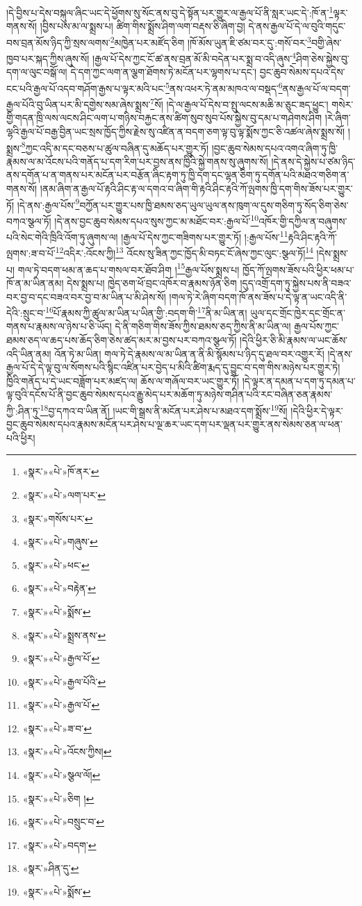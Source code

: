 །དེ་བྱིས་པ་དེས་བསྐུལ་ཞིང་ཡང་དེ་ཕྱོགས་སུ་སོང་ནས་བུ་དེ་སྟོན་པར་གྱུར་ལ་རྒྱལ་པོ་ནི་སླར་ཡང་དེ་:ཁོ་ན་\footnote{«སྣར་»«པེ་»ཁོ་ནར་}ལྟར་གནས་སོ། །བྱིས་པས་མ་ལ་སྨྲས་པ། ཚིག་གིས་སྨྲོས་ཤིག་ལག་བརྡས་ཅི་ཞིག་བྱ། དེ་ནས་རྒྱལ་པོ་དེ་ལ་བུའི་གདུང་བས་བྲན་མོས་ཉིད་ཀྱི་སྲས་ལགས་\footnote{«སྣར་»«པེ་»ལག་པར་}མཁྱེན་པར་མཛོད་ཅིག །ཁོ་མོས་ཡུན་ཇི་ཙམ་བར་དུ་:གསོ་བར་\footnote{«སྣར་»གསོས་པར་}བགྱི་ཞེས་ཁྱབ་པར་སྐད་ཀྱིས་ཞུས་སོ། །རྒྱལ་པོ་དེས་ཀྱང་ངོ་ཚ་ནས་བྲན་མོ་མི་བདེན་པར་སྨྲ་བ་འདི་ཞུས་\footnote{«སྣར་»«པེ་»གཞུས་}ཤིག་ཅེས་སྐྱེས་བུ་དག་ལ་ལུང་བསྒོ་ལ། དེ་དག་ཀྱང་ལག་ན་ལྕག་ཐོགས་ཏེ་མངོན་པར་ལྷགས་པ་དང་། བྱང་ཆུབ་སེམས་དཔའ་དེས་ངང་པའི་རྒྱལ་པོ་འདབ་གཤོག་རྒྱས་པ་ལྟར་མའི་པང་\footnote{«སྣར་»«པེ་»ཕང་}ནས་འཕར་ཏེ་ནམ་མཁའ་ལ་བསྡད་\footnote{«སྣར་»«པེ་»བརྟེན་}ནས་རྒྱལ་པོ་ལ་བདག་རྒྱལ་པོའི་བུ་ཡིན་པར་མི་དགྱེས་སམ་ཞེས་སྨྲས་\footnote{«སྣར་»«པེ་»སྨོས་}སོ། །དེ་ལ་རྒྱལ་པོ་དེས་བ་སྤུ་ལངས་མཆི་མ་ཅུང་ཟད་ཕྱུང་། གསེར་གྱི་གདན་ཁྲི་ལས་ལངས་ཤིང་ལག་པ་གཉིས་བརྐྱང་ནས་ཚིག་སུབ་སུབ་པོས་སྐྱེས་བུ་དམ་པ་གཤེགས་ཤིག །རེ་ཞིག་ལྷའི་རྒྱལ་པོ་བརྒྱ་བྱིན་ཡང་སྲས་ཁྱོད་ཀྱིས་རྗེས་སུ་འཛིན་ན་བདག་ཅག་ལྟ་བུ་ལྟ་སྨོས་ཀྱང་ཅི་འཚལ་ཞེས་སྨྲས་སོ། །སྨྲས་\footnote{«སྣར་»«པེ་»སྨྲས་ནས་}ཀྱང་འདི་མ་དང་བཅས་པ་ཚུལ་བཞིན་དུ་མཆོད་པར་གྱུར་ཏོ། །བྱང་ཆུབ་སེམས་དཔའ་འགའ་ཞིག་ཏུ་ཁྱི་རྣམས་ལ་མ་འོངས་པའི་གནོད་པ་དག་རིག་པར་བྱས་ནས་ཁྱིའི་སྐྱེ་གནས་སུ་ཞུགས་སོ། །དེ་ནས་དེ་སྐྱེས་པ་ཙམ་ཉིད་ནས་དགོན་པ་ན་གནས་པར་མངོན་པར་བརྩོན་ཞིང་རྟག་ཏུ་ཁྱི་དག་དང་ལྷན་ཅིག་ཏུ་དགོན་པའི་མཐའ་གཅིག་ན་གནས་སོ། །ནམ་ཞིག་ན་རྒྱལ་པོ་རྟའི་ཤིང་རྟ་ལ་དགའ་བ་ཞིག་གི་རྟའི་ཤིང་རྟའི་ཀོ་ལྤགས་ཁྱི་དག་གིས་ཟོས་པར་གྱུར་ཏོ། །དེ་ནས་:རྒྱལ་པོས་\footnote{«སྣར་»«པེ་»རྒྱལ་པོ་}བཀྱོན་པར་གྱུར་པས་ཁྱི་ཐམས་ཅད་ཡུལ་ཡུལ་ནས་ཁུག་ལ་དུས་གཅིག་ཏུ་སོད་ཅིག་ཅེས་བཀའ་སྩལ་ཏོ། །དེ་ནས་བྱང་ཆུབ་སེམས་དཔའ་སུས་ཀྱང་མ་མཐོང་བར་:རྒྱལ་པོ་\footnote{«སྣར་»«པེ་»རྒྱལ་པོའི་}འཁོར་གྱི་དཀྱིལ་ན་བཞུགས་པའི་སེང་གེའི་ཁྲིའི་འོག་ཏུ་ཞུགས་ལ། །རྒྱལ་པོ་དེས་ཀྱང་གཟིགས་པར་གྱུར་ཏོ། །:རྒྱལ་པོས་\footnote{«སྣར་»«པེ་»རྒྱལ་པོ་}རྟའི་ཤིང་རྟའི་ཀོ་ལྤགས་:ཟ་བ་པོ་\footnote{«སྣར་»«པེ་»ཟ་བ་}འདིར་:འོངས་ཀྱི།\footnote{«སྣར་»«པེ་»འོངས་ཀྱིས།} འོངས་སུ་ཟིན་ཀྱང་ཁྱོད་མི་བཏང་ངོ་ཞེས་ཀྱང་ལུང་:སྩལ་ཏོ།\footnote{«སྣར་»«པེ་»སྩལ་ལོ།} །དེས་སྨྲས་པ། གལ་ཏེ་བདག་ཕམ་ན་ཆད་པ་གསལ་བར་ཐོབ་ཤིག །\footnote{«སྣར་»«པེ་»ཅིག །}རྒྱལ་པོས་སྨྲས་པ། ཁྱོད་ཀོ་ལྤགས་ཟོས་པའི་ཕྱིར་ཕམ་པ་ཁོ་ན་མ་ཡིན་ནམ། དེས་སྨྲས་པ། ཁྱེད་ཅག་ཕོ་བྲང་འཁོར་བ་རྣམས་ཉོན་ཅིག །དུད་འགྲོ་དག་ཏུ་སྐྱེས་པས་ནི་བཟའ་བར་བྱ་བ་དང་བཟའ་བར་བྱ་བ་མ་ཡིན་པ་མི་ཤེས་སོ། །གལ་ཏེ་རེ་ཞིག་བདག་ཁོ་ནས་ཟོས་པ་དེ་ལྟ་ན་ཡང་འདི་ནི་དེའི་:སྲུང་བ་\footnote{«སྣར་»«པེ་»བསྲུང་བ་}པོ་རྣམས་ཀྱི་ཚུལ་མ་ཡིན་པ་ཡིན་གྱི་:བདག་གི་\footnote{«སྣར་»«པེ་»བདག་}ནི་མ་ཡིན་ན། ཡུལ་དང་གྲོང་ཁྱེར་དང་གྲོང་ན་གནས་པ་རྣམས་ལ་ཉེས་པ་ཅི་ཡོད། དེ་ནི་གཅིག་གིས་ཟོས་ཀྱིས་ཐམས་ཅད་ཀྱིས་ནི་མ་ཡིན་ལ། རྒྱལ་པོས་ཀྱང་ཐམས་ཅད་ལ་ཆད་པས་ཆོད་ཅིག་ཅེས་ཚད་མར་མ་བྱས་པར་བཀའ་སྩལ་ཏོ། །དེའི་ཕྱིར་ཅི་མི་རྣམས་ལ་ཡང་ཆོས་འདི་ཡིན་ནམ། འོན་ཏེ་མ་ཡིན། གལ་ཏེ་དེ་རྣམས་ལ་མ་ཡིན་ན་ནི་མི་སྙོམས་པ་ཉིད་དུ་ཐལ་བར་འགྱུར་རོ། །དེ་ནས་རྒྱལ་པོ་དེ་དེ་ལྟ་བུ་ལ་སོགས་པའི་སྙིང་འཛིན་པར་བྱེད་པ་མིའི་ཚིག་རྨད་དུ་བྱུང་བ་དག་གིས་མཉེས་པར་གྱུར་ཏེ། ཁྱིའི་གནོད་པ་དེ་ཡང་བཟློག་པར་མཛད་ལ། ཆོས་ལ་གཞོལ་བར་ཡང་གྱུར་ཏོ། །དེ་ལྟར་ན་དམན་པ་དག་ཏུ་དམན་པ་ལྟ་བུའི་དངོས་པོ་ནི་བྱང་ཆུབ་སེམས་དཔའ་རྒྱུ་མེད་པར་མཆོག་ཏུ་མཉེས་གཤིན་པའི་རང་བཞིན་ཅན་རྣམས་ཀྱི་:ཤིན་ཏུ་\footnote{«སྣར་»ཤིན་དུ་}བྱ་དཀའ་བ་ཡིན་ནོ། །ཡང་གི་སྒྲས་ནི་མངོན་པར་ཤེས་པ་མཐའ་དག་སྨྲོས་\footnote{«སྣར་»«པེ་»སྨོས་}སོ། །དེའི་ཕྱིར་དེ་ལྟར་བྱང་ཆུབ་སེམས་དཔའ་རྣམས་མངོན་པར་ཤེས་པ་ལྔ་ཆར་ཡང་དག་པར་ལྡན་པར་གྱུར་ནས་སེམས་ཅན་ལ་ཕན་པའི་ཕྱིར། 